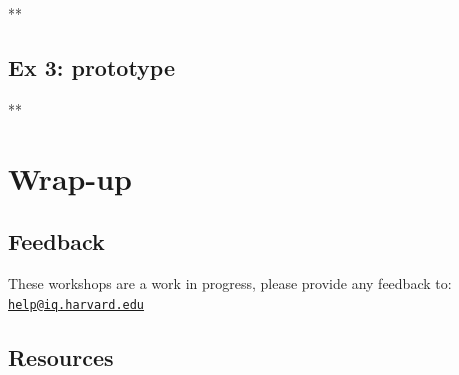 \documentclass[
]{book}
\newenvironment{Shaded}{\begin{snugshade}}{\end{snugshade}}
\newcommand{\NormalTok}[1]{#1}
\begin{document}
\begin{Shaded}
\begin{Highlighting}[]
\NormalTok{**}
\end{Highlighting}
\end{Shaded}

\hypertarget{ex-3-prototype-4}{%
\subsection{Ex 3: prototype}\label{ex-3-prototype-4}}

\begin{Shaded}
\begin{Highlighting}[]
\NormalTok{**}
\end{Highlighting}
\end{Shaded}

\hypertarget{wrap-up-7}{%
\section{Wrap-up}\label{wrap-up-7}}

\hypertarget{feedback-7}{%
\subsection{Feedback}\label{feedback-7}}

These workshops are a work in progress, please provide any feedback to: \href{mailto:help@iq.harvard.edu}{\nolinkurl{help@iq.harvard.edu}}

\hypertarget{resources-9}{%
\subsection{Resources}\label{resources-9}}
\end{document}
